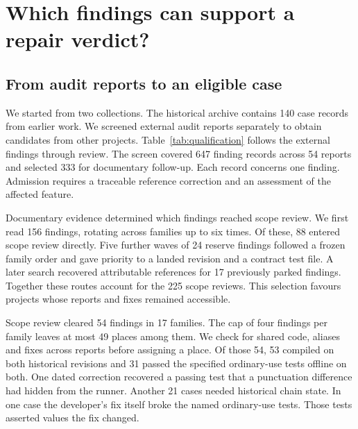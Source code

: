 \section{Which findings can support a repair verdict?}

\label{sec:qualification}

\subsection{From audit reports to an eligible case}

We started from two collections. The historical archive contains 140 case records from earlier work. We screened external audit reports separately to obtain candidates from other projects. Table~\ref{tab:qualification} follows the external findings through review. The screen covered 647 finding records across 54 reports and selected 333 for documentary follow-up. Each record concerns one finding. Admission requires a traceable reference correction and an assessment of the affected feature.

\begin{table}[tbp]
\centering
\caption{External findings from recruitment to human review. The maximum of 15 applies only to the current replacement pool and assumes that every remaining candidate qualifies.}
\label{tab:qualification}
\small

\end{table}

Documentary evidence determined which findings reached scope review. We first read 156 findings, rotating across families up to six times. Of these, 88 entered scope review directly. Five further waves of 24 reserve findings followed a frozen family order and gave priority to a landed revision and a contract test file. A later search recovered attributable references for 17 previously parked findings. Together these routes account for the 225 scope reviews. This selection favours projects whose reports and fixes remained accessible.

Scope review cleared 54 findings in 17 families. The cap of four findings per family leaves at most 49 places among them. We check for shared code, aliases and fixes across reports before assigning a place. Of those 54, 53 compiled on both historical revisions and 31 passed the specified ordinary-use tests offline on both. One dated correction recovered a passing test that a punctuation difference had hidden from the runner. Another 21 cases needed historical chain state. In one case the developer's fix itself broke the named ordinary-use tests. Those tests asserted values the fix changed.


